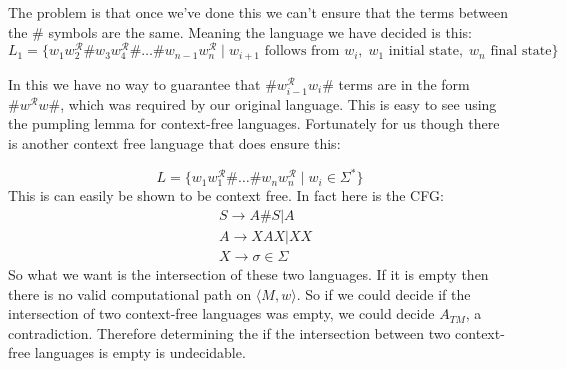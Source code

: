 \documentclass[english]{article}
\begin{document}
The problem is that once we've done this we can't ensure that the terms between
the $\#$ symbols are the same. Meaning the language we have decided is this:
\begin{equation*}
L_1 = \{ w_1 w_2^\mathcal{R} \# w_3 w_4^\mathcal{R} \# \ldots
			\# w_{n-1} w_n^\mathcal{R} \mid
		w_{i+1} \textrm{ follows from } w_i,\; w_1 \textrm{ initial state}, \;
		w_n \textrm{ final state} \}
\end{equation*}

In this we have no way to guarantee that $\# w_{i-1}^\mathcal{R} w_i \#$
terms are in the form $\# w^\mathcal{R} w \#$, which was required by our
original language. This is easy to see using the pumpling lemma for
context-free languages. Fortunately for us though there is another context free
language that does ensure this:

\begin{equation*}
L = \{ w_1 w_1^\mathcal{R} \#  \ldots \# w_n w_n^\mathcal{R} \mid
        w_i \in \Sigma^* \}
\end{equation*}
This is can easily be shown to be context free. In fact here is the CFG:
\begin{align*}
& S \rightarrow A\#S | A \\
& A \rightarrow X A X | XX \\
& X \rightarrow \sigma \in \Sigma
\end{align*}
So what we want is the intersection of these two languages. If it is empty then
there is no valid computational path on $\langle M,w \rangle$. So if we could
decide if the intersection of two context-free languages was empty, we could
decide $A_{TM}$, a contradiction. Therefore determining the if the intersection
between two context-free languages is empty is undecidable.
\end{document}
